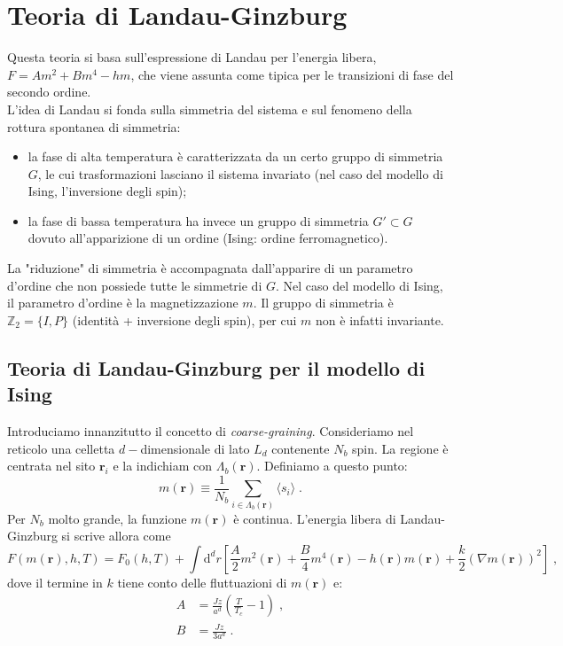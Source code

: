 \documentclass[10pt,a4paper]{report}
\theoremstyle{definition}
\numberwithin{equation}{section}
\newcommand{\diff}[1][]{\mathrm{d}#1}
\newcommand{\bra}{\langle}
\newcommand{\ket}{\rangle}
\begin{document}
\section{Teoria di Landau-Ginzburg}
Questa teoria si basa sull'espressione di Landau per l'energia libera, $F=Am^2+Bm^4-hm$, che viene assunta come tipica per le transizioni di fase del secondo ordine. \\
L'idea di Landau si fonda sulla simmetria del sistema e sul fenomeno della rottura spontanea di simmetria:
\begin{itemize}
\item la fase di alta temperatura è caratterizzata da un certo gruppo di simmetria $G$, le cui trasformazioni lasciano il sistema invariato (nel caso del modello di Ising, l'inversione degli spin);
\item la fase di bassa temperatura ha invece un gruppo di simmetria $G'\subset G$ dovuto all'apparizione di un ordine (Ising: ordine ferromagnetico).
\end{itemize}
La "riduzione" di simmetria è accompagnata dall'apparire di un parametro d'ordine che non possiede tutte le simmetrie di $G$. Nel caso del modello di Ising, il parametro d'ordine è la magnetizzazione $m$. Il gruppo di simmetria è $\mathbb{Z}_2=\{I,P\}$ (identità + inversione degli spin), per cui $m$ non è infatti invariante.
\subsection{Teoria di Landau-Ginzburg per il modello di Ising}
Introduciamo innanzitutto il concetto di \emph{coarse-graining}. Consideriamo nel reticolo una celletta $d-$dimensionale di lato $L_d$ contenente $N_b$ spin. La regione è centrata nel sito $\mathbf{r}_i$ e la indichiam con $\Lambda_b(\mathbf{r})$. Definiamo a questo punto:
\begin{equation}
m(\mathbf{r})\equiv \frac{1}{N_b}\sum_{i\in\Lambda_b(\mathbf{r})}\bra s_i\ket\;.
\end{equation}
Per $N_b$ molto grande, la funzione $m(\mathbf{r})$ è continua. L'energia libera di Landau-Ginzburg si scrive allora come
\begin{equation}
F(m(\mathbf{r}),h,T)=F_0(h,T)+\int\diff^d{r}\left[\frac{A}{2}m^2(\mathbf{r})+\frac{B}{4}m^4(\mathbf{r})-h(\mathbf{r})m(\mathbf{r})+\frac{k}{2}(\nabla m(\mathbf{r}))^2\right]\;,
\end{equation}
dove il termine in $k$ tiene conto delle fluttuazioni di $m(\mathbf{r})$ e:
\begin{align*}
A &= \frac{Jz}{a^d}\left(\frac{T}{T_c}-1\right)\;, \\
B &= \frac{Jz}{3a^d}\;.
\end{align*}
\end{document}
